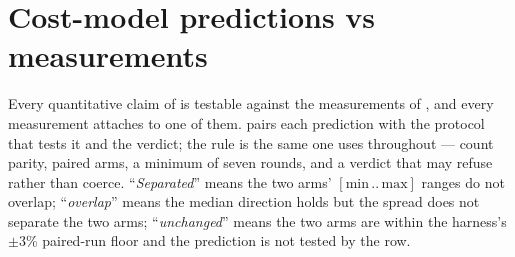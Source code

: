 \documentclass[11pt,letterpaper]{article}
\begin{document}
\section{Cost-model predictions vs measurements}
\label{sec:predictions}

Every quantitative claim of  is testable against the
measurements of , and every measurement attaches to one of
them.  pairs each prediction with the protocol that
tests it and the verdict; the rule is the same one  uses
throughout --- count parity, paired arms, a minimum of seven rounds, and a
verdict that may refuse rather than coerce. ``\emph{Separated}'' means the
two arms' \([\text{min}\,..\,\text{max}]\) ranges do not overlap;
``\emph{overlap}'' means the median direction holds but the spread does
not separate the two arms; ``\emph{unchanged}'' means the two arms are
within the harness's $\pm 3$\% paired-run floor and the prediction is not
tested by the row.
\end{document}
